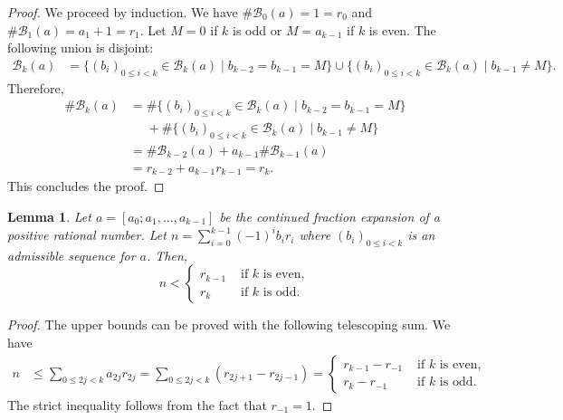 \documentclass[a4paper,12pt]{amsart}
\newtheorem{lemma}[definition]{Lemma}
\newcommand{\Bcal}{{\mathcal{B}}}
\newcommand{\0}{\mathtt{0}}
\newcommand{\1}{\mathtt{1}}
\newcommand{\2}{\mathtt{2}}
\newcommand{\3}{\mathtt{3}}
\begin{document}
\begin{proof}
    We proceed by induction.
    We have $\#\Bcal_{0}(a) = 1 = r_{0}$
    and $\#\Bcal_{1}(a) = a_1 + 1 = r_{1}$.
    Let $M=0$ if $k$ is odd or $M=a_{k-1}$ if $k$ is even.
    The following union is disjoint:
    \begin{align*}
        \Bcal_{k}(a)
        &=
        \{(b_i)_{0\leq i< k}\in\Bcal_{k}(a)
          \mid b_{k-2}=b_{k-1}=M\}
        \cup
        \{(b_i)_{0\leq i< k}\in\Bcal_{k}(a)
          \mid b_{k-1}\neq M\}.
    \end{align*}
    Therefore,
    \begin{align*}
        \#\Bcal_{k}(a)
        &=
        \#\{(b_i)_{0\leq i< k}\in\Bcal_{k}(a)
          \mid b_{k-2}=b_{k-1}=M\}\\
        &\phantom{=}+
        \#\{(b_i)_{0\leq i< k}\in\Bcal_{k}(a)
          \mid b_{k-1}\neq M\}\\
        &=
        \#\Bcal_{k-2}(a)
        + a_{k-1}\#\Bcal_{k-1}(a)\\
        &= r_{k-2} + a_{k-1}r_{k-1}
         = r_{k}.
    \end{align*}
    This concludes the proof.
\end{proof}

\begin{lemma}\label{lem:upper-bounds-on-the-sum}
    Let $a=[a_0; a_1, \dots, a_{k-1}]$ be the continued fraction expansion
    of a positive rational number.
    Let $n= \sum_{i=0}^{k-1} (-1)^{i}b_{i}r_{i}$
    where $(b_i)_{0\leq i< k}$ is an admissible
    sequence for $a$. Then,
    \[
        n <
        \begin{cases}
            r_{k-1} & \text{ if $k$ is even},\\
            r_k     & \text{ if $k$ is odd}.
        \end{cases}
    \]
\end{lemma}

\begin{proof}
    The upper bounds can be proved with the following telescoping sum.
    We have
    \begin{align*}
        n%
        &\leq \sum_{0\leq 2j <k} a_{2j}r_{2j}
        = \sum_{0\leq 2j <k} (r_{2j+1}-r_{2j-1})
        =
        \begin{cases}
            r_{k-1} - r_{-1} & \text{ if $k$ is even},\\
            r_k - r_{-1} & \text{ if $k$ is odd}.
        \end{cases}
    \end{align*}
    The strict inequality follows from the fact that $r_{-1}=1$.
\end{proof}
\end{document}
